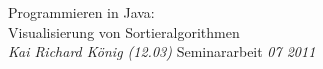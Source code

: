 \documentclass[dvips,letterpaper,12pt]{report}
\begin{document}

\thesistitle
	{Programmieren in Java: \\
	 Visualisierung von Sortieralgorithmen\\}
	{\emph{Kai Richard König (12.03)}}
	{Seminararbeit}
	{\emph{07 2011}}




% 
% 




 
 
% 
% 



\appendix

\end{document}
